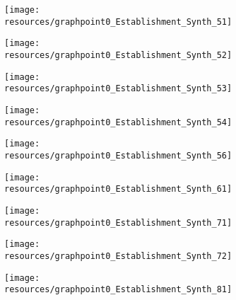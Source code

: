 \documentclass[12pt]{article}
\begin{document}
\begin{figure}[H]
	\centering
	\begin{subfigure}[b]{0.4\textwidth}
	    \texttt{[image: resources/graphpoint0\_Establishment\_Synth\_51]}
	\end{subfigure}
	\begin{subfigure}[b]{0.4\textwidth}
		  \texttt{[image: resources/graphpoint0\_Establishment\_Synth\_52]}
	\end{subfigure}
\end{figure}

\begin{figure}[H]
	\centering
	\begin{subfigure}[b]{0.4\textwidth}
	    \texttt{[image: resources/graphpoint0\_Establishment\_Synth\_53]}
	\end{subfigure}
	\begin{subfigure}[b]{0.4\textwidth}
		  \texttt{[image: resources/graphpoint0\_Establishment\_Synth\_54]}
	\end{subfigure}
\end{figure}

\begin{figure}[H]
	\centering
	\begin{subfigure}[b]{0.4\textwidth}
	    \texttt{[image: resources/graphpoint0\_Establishment\_Synth\_56]}
	\end{subfigure}
	\begin{subfigure}[b]{0.4\textwidth}
		  \texttt{[image: resources/graphpoint0\_Establishment\_Synth\_61]}
	\end{subfigure}
\end{figure}

\begin{figure}[H]
	\centering
	\begin{subfigure}[b]{0.4\textwidth}
	    \texttt{[image: resources/graphpoint0\_Establishment\_Synth\_71]}
	\end{subfigure}
	\begin{subfigure}[b]{0.4\textwidth}
		  \texttt{[image: resources/graphpoint0\_Establishment\_Synth\_72]}
	\end{subfigure}
\end{figure}

\begin{figure}[H]
	\centering
	\begin{subfigure}[b]{0.4\textwidth}
	    \texttt{[image: resources/graphpoint0\_Establishment\_Synth\_81]}
	\end{subfigure}
\end{figure}
\end{document}
